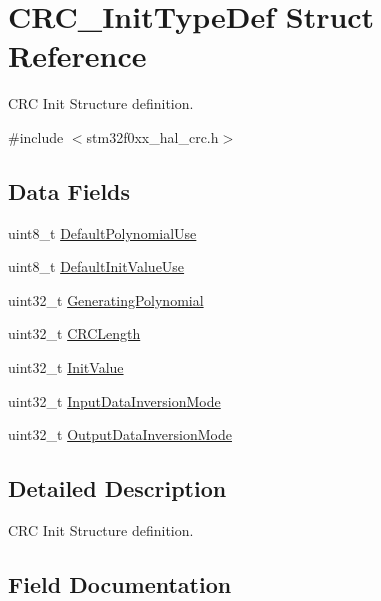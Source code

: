\hypertarget{struct_c_r_c___init_type_def}{}\section{C\+R\+C\+\_\+\+Init\+Type\+Def Struct Reference}
\label{struct_c_r_c___init_type_def}


C\+RC Init Structure definition.  




{\ttfamily \#include $<$stm32f0xx\+\_\+hal\+\_\+crc.\+h$>$}

\subsection*{Data Fields}
\begin{DoxyCompactItemize}
\item 
uint8\+\_\+t \hyperlink{struct_c_r_c___init_type_def_a310c3780f74e347a909fd5629011d4ed}{Default\+Polynomial\+Use}
\item 
uint8\+\_\+t \hyperlink{struct_c_r_c___init_type_def_a995114f44b6488f784f24a9faa184813}{Default\+Init\+Value\+Use}
\item 
uint32\+\_\+t \hyperlink{struct_c_r_c___init_type_def_a8eba50c4d083261700ecd9fdf9906124}{Generating\+Polynomial}
\item 
uint32\+\_\+t \hyperlink{struct_c_r_c___init_type_def_aba709d1ebebac9b3385fb61d6eeb79a2}{C\+R\+C\+Length}
\item 
uint32\+\_\+t \hyperlink{struct_c_r_c___init_type_def_ac60396fcb8285f785650dc65530d9077}{Init\+Value}
\item 
uint32\+\_\+t \hyperlink{struct_c_r_c___init_type_def_ae78b0467ba2913d30b23dd7e30c2f87e}{Input\+Data\+Inversion\+Mode}
\item 
uint32\+\_\+t \hyperlink{struct_c_r_c___init_type_def_a70287496add23b9e3dbaaf370a83040a}{Output\+Data\+Inversion\+Mode}
\end{DoxyCompactItemize}


\subsection{Detailed Description}
C\+RC Init Structure definition. 

\subsection{Field Documentation}
\mbox{\label{struct_c_r_c___init_type_def_aba709d1ebebac9b3385fb61d6eeb79a2}} 
